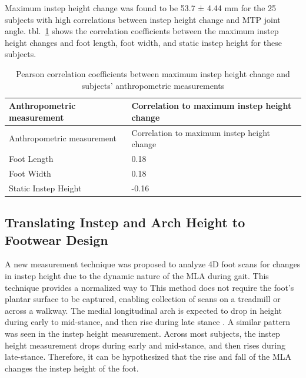 \documentclass[defaultstyle,11pt]{comps}
\begin{document}
Maximum instep height change was found to be 53.7 ± 4.44 mm for the 25 subjects with high correlations between instep height change and MTP joint angle.
tbl.~\ref{tbl:corrs} shows the correlation coefficients between the maximum instep height changes and foot length, foot width, and static instep height for these subjects.

\hypertarget{tbl:corrs}{}
\begin{longtable}[]{@{}ll@{}}
\caption{\label{tbl:corrs}Pearson correlation coefficients between maximum instep height change and subjects' anthropometric measurements}\tabularnewline
\toprule
Anthropometric measurement & Correlation to maximum instep height change \\
\midrule
\endfirsthead
\toprule
Anthropometric measurement & Correlation to maximum instep height change \\
\midrule
\endhead
Foot Length & 0.18 \\
Foot Width & 0.18 \\
Static Instep Height & -0.16 \\
\bottomrule
\end{longtable}

\hypertarget{translating-instep-and-arch-height-to-footwear-design}{%
\subsection{Translating Instep and Arch Height to Footwear Design}\label{translating-instep-and-arch-height-to-footwear-design}}

A new measurement technique was proposed to analyze 4D foot scans for changes in instep height due to the dynamic nature of the MLA during gait.
This technique provides a normalized way to This method does not require the foot's plantar surface to be captured, enabling collection of scans on a treadmill or across a walkway.
The medial longitudinal arch is expected to drop in height during early to mid-stance, and then rise during late stance \citep{Hicks1954, Ker1987, Caravaggi2010, Cashmere1999, Leardini2007, Stolwijk2014, Welte2018, Welte2021}.
A similar pattern was seen in the instep height measurement.
Across most subjects, the instep height measurement drops during early and mid-stance, and then rises during late-stance. Therefore, it can be hypothesized that the rise and fall of the MLA changes the instep height of the foot.
\end{document}
